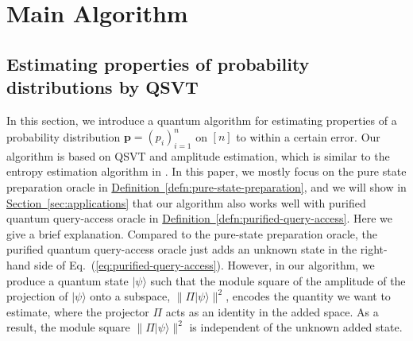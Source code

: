 \documentclass[journal]{IEEEtran}
\newtheorem{definition}{Definition}
\newcommand{\eq}[1]{Eq.~(\ref{eq:#1})}
\newcommand{\defn}[1]{\hyperref[defn:#1]{Definition~\ref*{defn:#1}}}
\renewcommand{\sec}[1]{\hyperref[sec:#1]{Section~\ref*{sec:#1}}}
\begin{document}

\section{Main Algorithm}\label{sec:main-algorithm}
\label{sec:main_algo}


\subsection{Estimating properties of probability distributions by QSVT}
\label{sec:main_algo_standard}
\noindent
In this section, we introduce a quantum algorithm for estimating properties of a probability distribution $\mathbf{p} = (p_i)_{i=1}^n$ on $[n]$ to within a certain error. Our algorithm is based on QSVT and amplitude estimation, which is similar to the entropy estimation algorithm in \cite{gilyen2019distributional}. In this paper, we mostly focus on the pure state preparation oracle in \defn{pure-state-preparation}, and we will show in \sec{applications} that our algorithm also works well with purified quantum query-access oracle in \defn{purified-query-access}. Here we give a brief explanation. Compared to the pure-state preparation oracle, the purified quantum query-access oracle just adds an unknown state in the right-hand side of \eq{purified-query-access}. However, in our algorithm, we produce a quantum state $|\psi\rangle$ such that the module square of the amplitude of the projection of $|\psi\rangle$ onto a subspace, $\|\Pi|\psi\rangle\|^2$, encodes the quantity we want to estimate, where the projector $\Pi$ acts as an identity in the added space. As a result, the module square $\|\Pi |\psi\rangle \|^2$ is independent of the unknown added state. 
\end{document}
